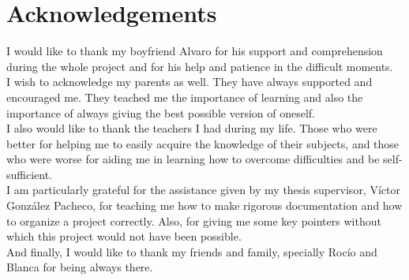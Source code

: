 \chapter*{Acknowledgements}
    
\begin {center}

\end{center}

I would like to thank my boyfriend Alvaro for his support and comprehension during the whole project and for his help and patience in the difficult moments. 
\\

I wish to acknowledge my parents as well. They have always supported and encouraged me. They teached me the importance of learning and also the importance of always giving the best possible version of oneself.
\\

I also would like to thank the teachers I had during my life. Those who were better for helping me to easily acquire the knowledge of their subjects, and those who were worse for aiding me in learning how to overcome difficulties and be self-sufficient. 
\\


I am particularly grateful for the assistance given by my thesis supervisor, Víctor González Pacheco, for teaching me how to make rigorous documentation and how to organize a project correctly. Also, for giving me some key pointers without which this project would not have been possible. 
\\
  
And finally, I would like to thank my friends and family, specially Rocío and Blanca for being always there. 

